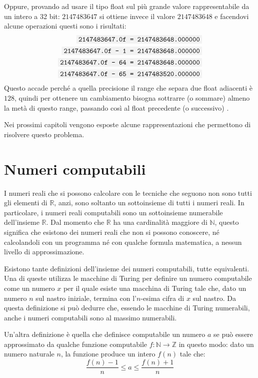 \documentclass[Lau,oneside]{sapthesis}
\newcommand{\code}[1]{\colorbox{light-gray}{\texttt{#1}}}
\begin{document}
Oppure, provando ad usare il tipo float sul più grande valore rappresentabile da un intero a 32 bit: $2147483647$ si ottiene invece il valore $2147483648$ e facendovi alcune operazioni questi sono i risultati:
\begin{align*}
\code{2147483647.0f = 2147483648.000000}\\
\code{2147483647.0f - 1 = 2147483648.000000}\\
\code{2147483647.0f - 64 = 2147483648.000000}\\
\code{2147483647.0f - 65 = 2147483520.000000}\\
\end{align*}
Questo accade perché a quella precisione il range che separa due float adiacenti è $128$, quindi per ottenere un cambiamento bisogna sottrarre (o sommare) almeno la metà di questo range, passando così al float precedente (o successivo) \cite{97Things}.

\medskip

Nei prossimi capitoli vengono esposte alcune rappresentazioni che 
permettono di risolvere questo problema.


\section{Numeri computabili}
I numeri reali che si possono calcolare con le tecniche che seguono non sono tutti gli elementi di $\mathbb{R}$, anzi, sono soltanto un sottoinsieme di tutti i numeri reali. In particolare, i numeri reali computabili sono un sottoinsieme numerabile dell'insieme $\mathbb{R}$. Dal momento che $\mathbb{R}$ ha una cardinalità maggiore di $\mathbb{N}$, questo significa che esistono dei numeri reali che non si possono conoscere, né calcolandoli con un programma né con qualche formula matematica, a nessun livello di approssimazione.

Esistono tante definizioni dell'insieme dei numeri computabili, tutte equivalenti. Una di queste \cite{Minsky} utilizza le macchine di Turing per definire un numero computabile come un numero $x$ per il quale esiste una macchina di Turing tale che, dato un numero $n$ sul nastro iniziale, termina con l'$n$-esima cifra di $x$ sul nastro. Da questa definizione si può dedurre che, essendo le macchine di Turing numerabili, anche i numeri computabili sono al massimo numerabili.

Un'altra definizione è quella che definisce computabile un numero $a$ se può essere approssimato da qualche funzione computabile $f : \mathbb{N} \rightarrow \mathbb{Z}$ in questo modo: dato un numero naturale $n$, la funzione produce un intero $f(n)$ tale che:
$$\frac{f(n)-1}{n} \leq a \leq \frac{f(n)+1}{n}$$
\end{document}
